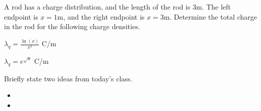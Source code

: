 \begin{problem}
\item A rod has a charge distribution, and the length of the rod is
  3m. The left endpoint is $x=1$m, and the right endpoint is
  $x=3$m. Determine the total charge in the rod for the following
  charge densities. 
  \begin{subproblem}
    \item $\lambda_q = \frac{\ln(x)}{x^2} $ C/m
      \vfill
    \item $\lambda_q = e^{\sqrt{x}}$ C/m
      \vfill
  \end{subproblem}
\end{problem}

\postClass

\begin{problem}
\item Briefly state two ideas from today's class.
  \begin{itemize}
  \item 
  \item 
  \end{itemize}
\item 
  \begin{subproblem}
    \item
  \end{subproblem}
\end{problem}



